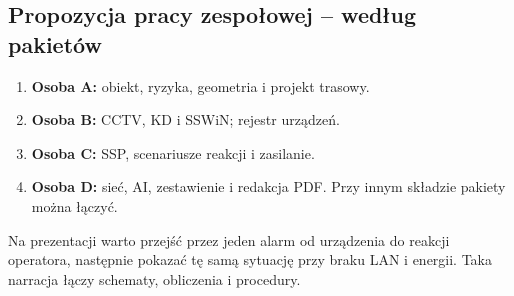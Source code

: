 \subsection*{Propozycja pracy zespołowej -- według pakietów}
\begin{enumerate}
\item \textbf{Osoba A:} obiekt, ryzyka, geometria i projekt trasowy.
\item \textbf{Osoba B:} CCTV, KD i SSWiN; rejestr urządzeń.
\item \textbf{Osoba C:} SSP, scenariusze reakcji i zasilanie.
\item \textbf{Osoba D:} sieć, AI, zestawienie i redakcja PDF. Przy innym składzie pakiety można łączyć.
\end{enumerate}
Na prezentacji warto przejść przez jeden alarm od urządzenia do reakcji operatora, następnie pokazać tę samą sytuację przy braku LAN i energii. Taka narracja łączy schematy, obliczenia i procedury.
